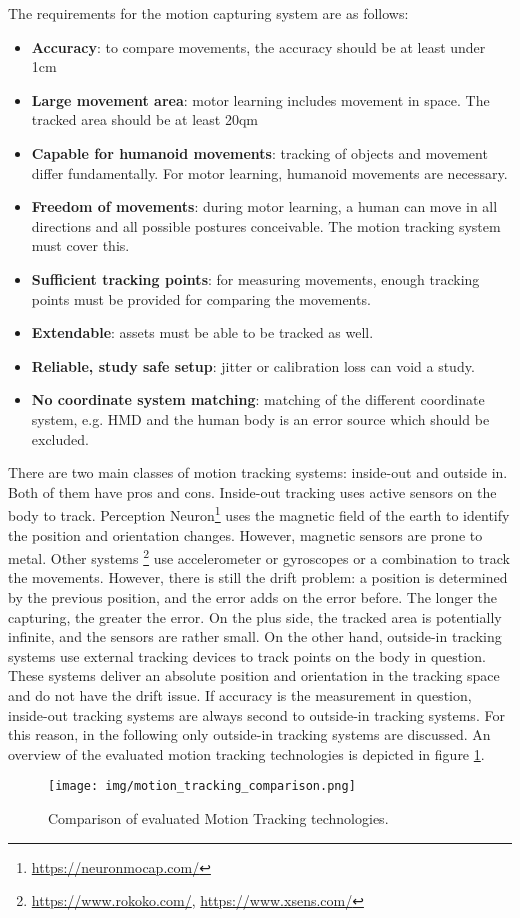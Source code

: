 The requirements for the motion capturing system are as follows: 
\begin{itemize}
	\item \textbf{Accuracy}: to compare movements, the accuracy should be at least under 1cm
	\item \textbf{Large movement area}: motor learning includes movement in space. The tracked area should be at least 20qm
	\item \textbf{Capable for humanoid movements}: tracking of objects and movement differ fundamentally. For motor learning, humanoid movements are necessary.
	\item \textbf{Freedom of movements}: during motor learning, a human can move in all directions and all possible postures conceivable. The motion tracking system must cover this.
	\item \textbf{Sufficient tracking points}: for measuring movements, enough tracking points must be provided for comparing the movements.
	\item \textbf{Extendable}: assets must be able to be tracked as well.
	\item \textbf{Reliable, study safe setup}: jitter or calibration loss can void a study.
	\item \textbf{No coordinate system matching}: matching of the different coordinate system, e.g. HMD and the human body is an error source which should be excluded.
\end{itemize}
There are two main classes of motion tracking systems: inside-out and outside in. Both of them have pros and cons. Inside-out tracking uses active sensors on the body to track. Perception Neuron\footnote{\href{https://neuronmocap.com/}{https://neuronmocap.com/}} uses the magnetic field of the earth to identify the position and orientation changes. However, magnetic sensors are prone to metal. Other systems \footnote{\href{https://www.rokoko.com/}{https://www.rokoko.com/}, \href{https://www.xsens.com/}{https://www.xsens.com/}} use accelerometer or gyroscopes or a combination to track the movements. However, there is still the drift problem: a position is determined by the previous position, and the error adds on the error before. The longer the capturing, the greater the error. On the plus side, the tracked area is potentially infinite, and the sensors are rather small. On the other hand, outside-in tracking systems use external tracking devices to track points on the body in question. These systems deliver an absolute position and orientation in the tracking space and do not have the drift issue. If accuracy is the measurement in question, inside-out tracking systems are always second to outside-in tracking systems. For this reason, in the following only outside-in tracking systems are discussed. An overview of the evaluated motion tracking technologies is depicted in figure \ref{fig:motionTrackingComparison}.
\begin{figure}
	\centering
	\texttt{[image: img/motion\_tracking\_comparison.png]}
	\caption{Comparison of evaluated Motion Tracking technologies.}
	\label{fig:motionTrackingComparison}
\end{figure}

